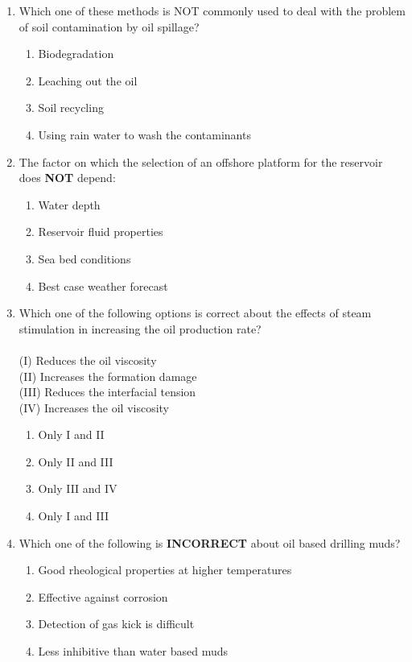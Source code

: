 \documentclass[12pt,a4paper]{article}
\begin{document}
\begin{enumerate}
\item Which one of these methods is NOT commonly used to deal with the problem of soil
contamination by oil spillage?\hfill{}
\begin{enumerate}
\item Biodegradation
\item Leaching out the oil
\item Soil recycling
\item Using rain water to wash the contaminants
\end{enumerate}

\item The factor on which the selection of an offshore platform for the reservoir does \textbf{NOT}
depend:\hfill{}
\begin{enumerate}
\item Water depth
\item Reservoir fluid properties
\item Sea bed conditions
\item Best case weather forecast
\end{enumerate}

\item Which one of the following options is correct about the effects of steam stimulation in
increasing the oil production rate?\hfill{}\\\\
(I) Reduces the oil viscosity\\
(II) Increases the formation damage\\
(III) Reduces the interfacial tension\\
(IV) Increases the oil viscosity
\begin{enumerate}
\item Only I and II
\item Only II and III
\item Only III and IV
\item Only I and III
\end{enumerate}
\pagebreak

\item  Which one of the following is \textbf{INCORRECT} about oil based drilling muds?\hfill{}
	\begin{enumerate}
		\item Good rheological properties at higher temperatures 
\item Effective against corrosion
\item Detection of gas kick is difficult
\item Less inhibitive than water based muds
\end{enumerate}


\end{enumerate}
\end{document}
